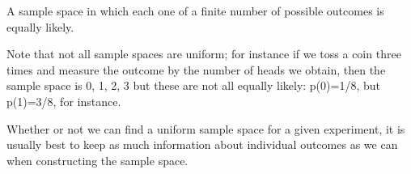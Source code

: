 A sample space in which each one of a finite number of possible 
outcomes is equally likely.
\par
Note that not all sample spaces are uniform; for instance if we toss
a coin three times and measure the outcome by the number of heads we obtain,
then the sample space is {0, 1, 2, 3} but these are not all equally likely:
p(0)=1/8, but p(1)=3/8, for instance.
\par
Whether or not we can find a uniform sample space for a given experiment,
it is usually best to keep as much information about individual outcomes as we can
when constructing the sample space.